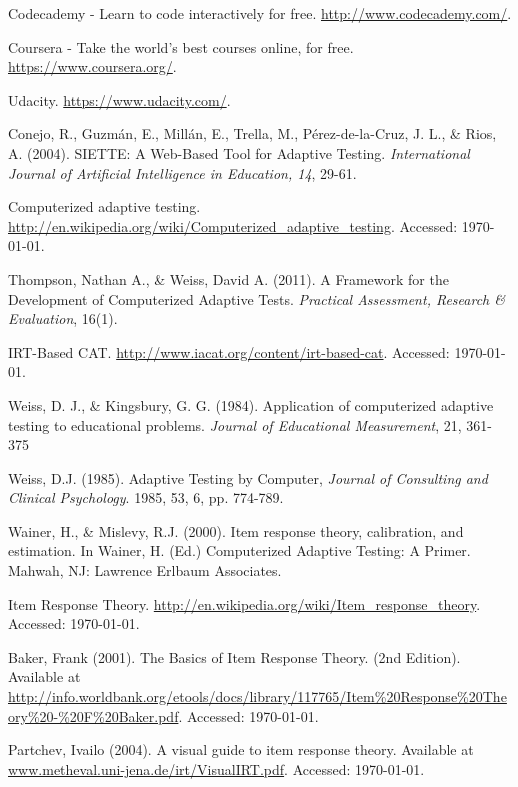 \begin{thebibliography}{9}

 Codecademy - Learn to code interactively for free. \url{http://www.codecademy.com/}.

 Coursera - Take the world's best courses online, for free. \url{https://www.coursera.org/}.

 Udacity. \url{https://www.udacity.com/}.

 Conejo, R., Guzmán, E., Millán, E., Trella, M., Pérez-de-la-Cruz, J. L., \& Rios, A. (2004). SIETTE: A Web-Based Tool for Adaptive Testing. \textit{International Journal of Artificial Intelligence in Education, 14}, 29-61.

 Computerized adaptive testing. \url{http://en.wikipedia.org/wiki/Computerized_adaptive_testing}. Accessed: \today.

 Thompson, Nathan A., \& Weiss, David A. (2011). A Framework for the Development of Computerized Adaptive Tests. \textit{Practical Assessment, Research \& Evaluation}, 16(1).

 IRT-Based CAT. \url{http://www.iacat.org/content/irt-based-cat}. Accessed: \today.

 Weiss, D. J., \& Kingsbury, G. G. (1984). Application of computerized adaptive testing to educational problems. \textit{Journal of Educational Measurement}, 21, 361-375

 Weiss, D.J. (1985). Adaptive Testing by Computer, \textit{Journal of Consulting and Clinical Psychology}. 1985, 53, 6, pp. 774-789.

 Wainer, H., \& Mislevy, R.J. (2000). Item response theory, calibration, and estimation. In Wainer, H. (Ed.) Computerized Adaptive Testing: A Primer. Mahwah, NJ: Lawrence Erlbaum Associates.

 Item Response Theory. \url{http://en.wikipedia.org/wiki/Item_response_theory}. Accessed: \today.

 Baker, Frank (2001). The Basics of Item Response Theory. (2nd Edition). Available at \url{http://info.worldbank.org/etools/docs/library/117765/Item\%20Response\%20Theory\%20-\%20F\%20Baker.pdf}. Accessed: \today.

 Partchev, Ivailo (2004). A visual guide to item response theory. Available at \url{www.metheval.uni-jena.de/irt/VisualIRT.pdf}. Accessed: \today.


\end{thebibliography}
